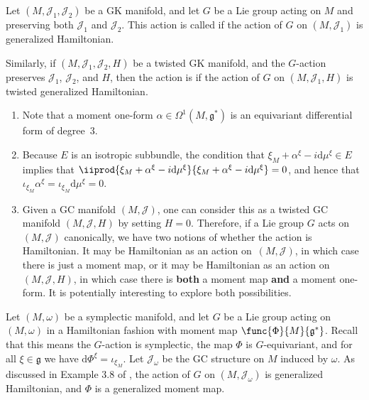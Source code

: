\begin{Definition}
Let $(M,\mathcal{J}_1,\mathcal{J}_2)$ be a GK manifold, and let $G$ be a Lie group acting on $M$ and preserving both $\mathcal{J}_1$ and $\mathcal{J}_2$.  This action is called  if the action of $G$ on $(M,\mathcal{J}_1)$ is generalized Hamiltonian.

Similarly, if $(M,\mathcal{J}_1,\mathcal{J}_2,H)$ be a twisted GK manifold, and the $G$-action preserves $\mathcal{J}_1$, $\mathcal{J}_2$, and $H$, then the action is  if the action of $G$ on $(M,\mathcal{J}_1,H)$ is twisted generalized Hamiltonian.
\end{Definition}


\begin{Remark} \label{rem1} \qquad
\begin{enumerate} \itemsep=0pt\litlet
  \item Note that a moment one-form $\alpha \in \Omega^1(M,\mathfrak{g}^*)$ is an equivariant dif\/ferential form of degree~$3$.

  \item Because $E$ is an isotropic subbundle, the condition that $\xi_M + \alpha^{\xi} - i \mathrm{d} \mu^{\xi} \in E$ implies that $\iiprod{\xi_M + \alpha^{\xi} - i \mathrm{d} \mu^{\xi}}{\xi_M + \alpha^{\xi} - i \mathrm{d} \mu^{\xi}}=0$, and hence that $\iota_{\xi_M} \alpha^{\xi} = \iota_{\xi_M} \mathrm{d} \mu^{\xi} = 0$.

  \item Given a GC manifold $(M,\mathcal{J})$, one can consider this as a twisted GC manifold $(M,\mathcal{J},H)$ by setting $H=0$.  Therefore, if a Lie group $G$ acts on $(M,\mathcal{J})$ canonically, we have two notions of whether the action is Hamiltonian.  It may be Hamiltonian as an action on~$(M,\mathcal{J})$, in which case there is just a moment map, or it may be Hamiltonian as an action on $(M,\mathcal{J},H)$, in which case there is {\bf both} a moment map {\bf and} a moment one-form.
  It is potentially interesting to explore both possibilities.
\end{enumerate}
\end{Remark}


\begin{Example} \label{example3}
Let $(M,\omega)$ be a symplectic manifold, and let $G$ be a Lie group acting on $(M,\omega)$ in a Hamiltonian fashion with moment map $\func{\Phi}{M}{\mathfrak{g}^*}$.  Recall that this means the $G$-action is symplectic, the map $\Phi$ is $G$-equivariant, and for all $\xi \in \mathfrak{g}$ we have $\mathrm{d} \Phi^{\xi} = \iota_{\xi_M}$.
Let $\mathcal{J}_{\omega}$ be the GC structure on $M$ induced by $\omega$.  As discussed in Example 3.8 of \cite{lintolman}, the action of $G$ on $(M,\mathcal{J}_{\omega})$ is generalized Hamiltonian, and $\Phi$ is a generalized moment map.
\end{Example}



